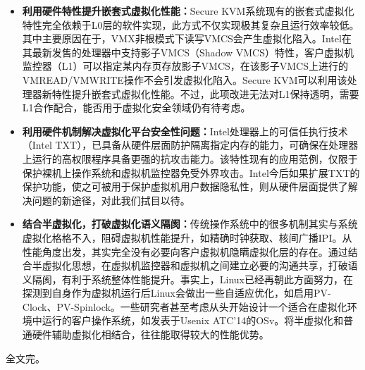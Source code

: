 \begin{itemize}
\item \textbf{利用硬件特性提升嵌套式虚拟化性能：}Secure KVM系统现有的嵌套式虚拟化特性完全依赖于L0层的软件实现，此方式不仅实现极其复杂且运行效率较低。其中主要原因在于，VMX非根模式下读写VMCS会产生虚拟化陷入。Intel在其最新发售的处理器中支持影子VMCS（Shadow VMCS）特性，客户虚拟机监控器（L1）可以指定某内存页存放影子VMCS，在该影子VMCS上进行的VMREAD/VMWRITE操作不会引发虚拟化陷入。Secure KVM可以利用该处理器新特性提升嵌套式虚拟化性能。不过，此项改进无法对L1保持透明，需要L1合作配合，能否用于虚拟化安全领域仍有待考虑。
\item \textbf{利用硬件机制解决虚拟化平台安全性问题：}Intel处理器上的可信任执行技术（Intel TXT），已具备从硬件层面防护隔离指定内存的能力，可确保在处理器上运行的高权限程序具备更强的抗攻击能力。该特性现有的应用范例，仅限于保护裸机上操作系统和虚拟机监控器免受外界攻击。Intel今后如果扩展TXT的保护功能，使之可被用于保护虚拟机用户数据隐私性，则从硬件层面提供了解决问题的新途径，对此我们拭目以待。
\item \textbf{结合半虚拟化，打破虚拟化语义隔阂：}传统操作系统中的很多机制其实与系统虚拟化格格不入，阻碍虚拟机性能提升，如精确时钟获取、核间广播IPI。从性能角度出发，其实完全没有必要向客户虚拟机隐瞒虚拟化层的存在。通过结合半虚拟化思想，在虚拟机监控器和虚拟机之间建立必要的沟通共享，打破语义隔阂，有利于系统整体性能提升。事实上，Linux已经再朝此方面努力，在探测到自身作为虚拟机运行后Linux会做出一些自适应优化，如启用PV-Clock、PV-Spinlock。一些研究者甚至考虑从头开始设计一个适合在虚拟化环境中运行的客户操作系统，如发表于Usenix ATC'14的OSv\cite{osv}。将半虚拟化和普通硬件辅助虚拟化相结合，往往能取得较大的性能优势。
\end{itemize}

全文完。




